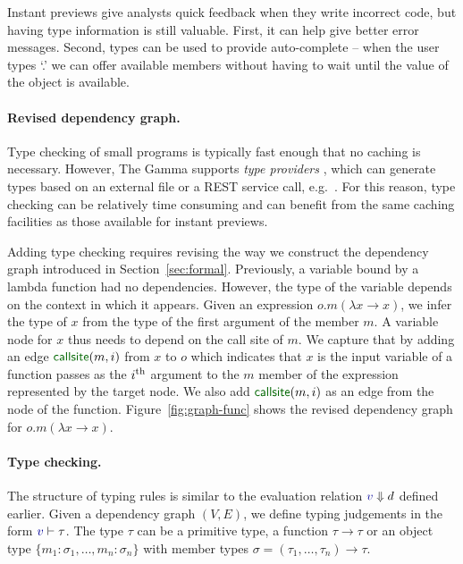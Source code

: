 \documentclass[english,crc]{programming}
\theoremstyle{plain}
\theoremstyle{definition}
\newcommand{\bndclr}[1]{\textcolor{kvdclr}{#1}}
\newcommand{\blbl}[1]{\textnormal{\textcolor{numclr}{\sffamily #1}}}
\begin{document}
Instant previews give analysts quick feedback when they write incorrect code, but
having type information is still valuable. First, it can help give better error messages. Second,
types can be used to provide auto-complete -- when the user types `.' we can offer available
members without having to wait until the value of the object is available.

\paragraph{Revised dependency graph.}
Type checking of small programs is typically fast enough that no caching is necessary. However,
The Gamma supports \emph{type providers} \cite{providers-fsharp,providers-idris}, which can
generate types based on an external file or a REST service call, e.g.~\cite{fsdata}. For this
reason, type checking can be relatively time consuming and can benefit from the same caching
facilities as those available for instant previews.

Adding type checking requires revising the way we construct the dependency graph introduced in
Section~\ref{sec:formal}. Previously, a variable bound by a lambda function had no dependencies.
However, the type of the variable depends on the context in which it appears. Given an expression
$o.m(\lambda x\rightarrow x)$, we infer the type of $x$ from the type of the first argument
of the member $m$. A variable node for $x$ thus needs to depend on the call site of $m$.
We capture that by adding an edge $\blbl{callsite}(m, i)$ from $x$ to $o$ which indicates that
$x$ is the input variable of a function passes as the $i^\textnormal{th}$ argument to the $m$
member of the expression represented by the target node. We also add $\blbl{callsite}(m, i)$
as an edge from the node of the function. Figure~\ref{fig:graph-func} shows the
revised dependency graph for $o.m(\lambda x\rightarrow x)$. %

\paragraph{Type checking.}
The structure of typing rules is similar to the evaluation relation $\bndclr{v}\Downarrow d$
defined earlier. Given a dependency graph $(V, E)$, we define typing judgements in the form
$\bndclr{v}\vdash \tau$. The type $\tau$ can be a primitive type, a function $\tau \rightarrow \tau$
or an object type $\{m_1\!:\!\sigma_1, \ldots, m_n\!:\!\sigma_n\}$ with member types
$\sigma = (\tau_1, \ldots, \tau_n) \rightarrow \tau$.
\end{document}
